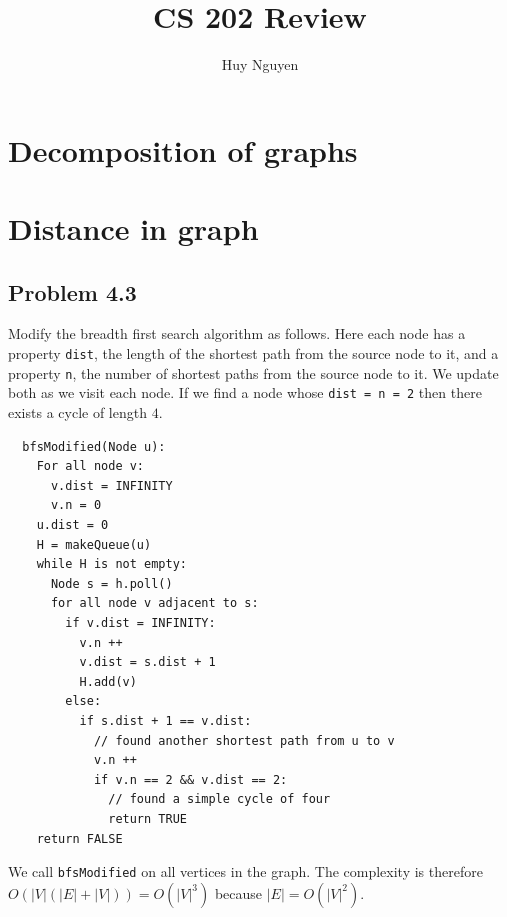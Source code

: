 \documentclass[12pt]{report}
\title{CS 202 Review}
\author{Huy Nguyen}
\newcommand{\co}{\texttt}
\begin{document}
\tableofcontents

\chapter[Chapter 3 Solution]{Decomposition of graphs}

\chapter[Chapter 4 Solution]{Distance in graph}

\section{Problem 4.3}
Modify the breadth first search algorithm as follows. Here each node has a property \co{dist}, the length of the shortest path from the source node to it, and a property \co{n}, the number of shortest paths from the source node to it. We update both as we visit each node. If we find a node whose \co{dist = n = 2} then there exists a cycle of length $4$.
\begin{lstlisting}
  bfsModified(Node u):
    For all node v:
      v.dist = INFINITY
      v.n = 0
    u.dist = 0
    H = makeQueue(u)
    while H is not empty:
      Node s = h.poll()
      for all node v adjacent to s:
        if v.dist = INFINITY:
          v.n ++
          v.dist = s.dist + 1
          H.add(v)
        else:
          if s.dist + 1 == v.dist:
            // found another shortest path from u to v
            v.n ++
            if v.n == 2 && v.dist == 2:
              // found a simple cycle of four
              return TRUE
    return FALSE
\end{lstlisting}
We call \co{bfsModified} on all vertices in the graph. The complexity is therefore $O(|V| ( |E| + |V|)) = O(|V|^3)$ because $|E| = O(|V|^2)$.
\end{document}
